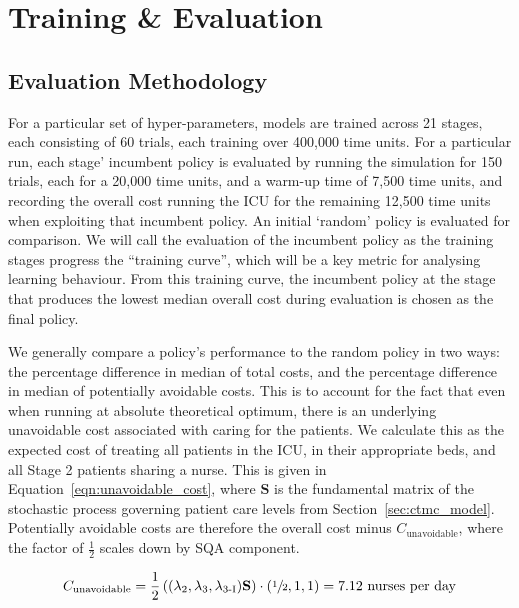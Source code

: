 \documentclass{article}
\begin{document}
\section{Training \& Evaluation}\label{sec:training}

\subsection{Evaluation Methodology}
For a particular set of hyper-parameters, models are trained across 21 stages,
each consisting of 60 trials, each training over 400,000 time units.
For a particular run, each stage' incumbent policy is evaluated by running the
simulation for 150 trials, each for a 20,000 time units, and a warm-up time of
7,500 time units, and recording the overall cost running the ICU for the
remaining 12,500 time units when exploiting that incumbent policy.
An initial `random' policy is evaluated for comparison.
We will call the evaluation of the incumbent policy as the training stages
progress the ``training curve'', which will be a key metric for analysing
learning behaviour.
From this training curve, the incumbent policy at the stage that produces the
lowest median overall cost during evaluation is chosen as the final policy.

We generally compare a policy's performance to the random policy in two ways:
the percentage difference in median of total costs, and the percentage
difference in median of potentially avoidable costs.
This is to account for the fact that even when running at absolute theoretical
optimum, there is an underlying unavoidable cost associated with caring for the 
patients.
We calculate this as the expected cost of treating all patients in the ICU, in
their appropriate beds, and all Stage 2 patients sharing a nurse.
This is given in Equation~\ref{eqn:unavoidable_cost}, where $\mathbf{S}$ is the
fundamental matrix of the stochastic process governing patient care levels from
Section~\ref{sec:ctmc_model}.
Potentially avoidable costs are therefore the overall cost minus
$C_{\text{unavoidable}}$, where the factor of $\frac{1}{2}$ scales down by SQA
component.

\begin{equation}\label{eqn:unavoidable_cost}
C_{\text{unavoidable}} = \frac{1}{2}\left((\lambda_2, \lambda_3, \lambda_{3\text{-I}}) \mathbf{S}\right) \cdot \left(\sfrac{1}{2}, 1, 1\right) = 7.12 \text{ nurses per day}
\end{equation}
\end{document}
